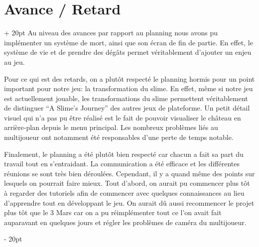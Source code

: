 \documentclass[a4paper, 12pt, twoside]{article}
\newcommand{\ind}[1][20pt]{\advance\leftskip + #1}
\newcommand{\deind}[1][20pt]{\advance\leftskip - #1}
\newenvironment{indt}[2][20pt]{#2 \par \ind[#1]}{\par \deind} %
\begin{document}
    \begin{indt}{\section{Avance / Retard}}
        Au niveau des avances par rapport au planning nous avons pu implémenter un système de mort, ainsi que son écran de fin de partie. En effet, le système de vie et de prendre des dégâts permet véritablement d'ajouter un enjeu au jeu. 

	    Pour ce qui est des retards, on a plutôt respecté le planning hormis pour un point important pour notre jeu: la transformation du slime. En effet, même si notre jeu est actuellement jouable, les transformations du slime permettent véritablement de distinguer “A Slime's Journey” des autres jeux de plateforme. Un petit détail visuel qui n'a pas pu être réalisé est le fait de pouvoir visualiser le château  en arrière-plan depuis le menu principal. Les nombreux problèmes liés au multijoueur ont notamment été responsables d'une perte de temps notable.

	    Finalement, le planning a été plutôt bien respecté car chacun a fait sa part du travail tout en s'entraidant. La communication a été efficace et les différentes réunions se sont très bien déroulées. Cependant, il y a quand même des points sur lesquels on pourrait faire mieux. Tout d'abord, on aurait pu commencer plus tôt à regarder des tutoriels afin de commencer avec quelques connaissances au lieu d'apprendre tout en développant le jeu. On aurait dû aussi recommencer le projet plus tôt que le 3 Mars car on a pu réimplémenter tout ce l'on avait fait auparavant en quelques jours et régler les problèmes de caméra du multijoueur.

    \end{indt}

    \newpage
\end{document}
